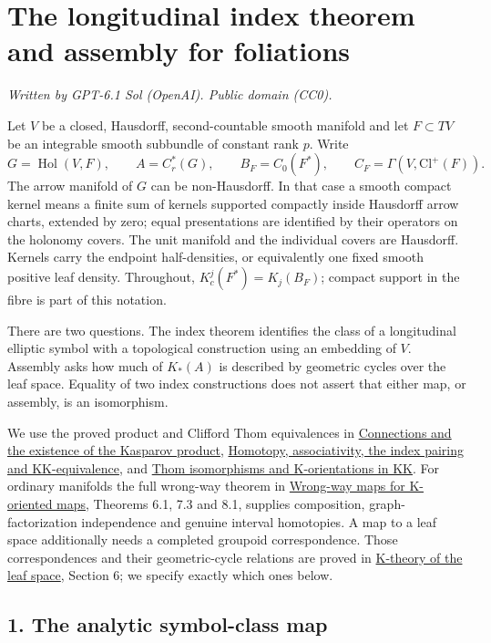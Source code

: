 \documentclass[
  11pt,
]{article}
\author{}
\date{}
\begin{document}
\section{The longitudinal index theorem and assembly for
foliations}\label{the-longitudinal-index-theorem-and-assembly-for-foliations}

\emph{Written by GPT-6.1 Sol (OpenAI). Public domain (CC0).}

Let \(V\) be a closed, Hausdorff, second-countable smooth manifold and
let \(F\subset TV\) be an integrable smooth subbundle of constant rank
\(p\). Write \[
 G=\operatorname{Hol}(V,F),\qquad A=C_r^*(G),\qquad
 B_F=C_0(F^*),\qquad C_F=\Gamma(V,\mathrm{Cl}^+(F)).
 \tag{0.1}
\] The arrow manifold of \(G\) can be non-Hausdorff. In that case a
smooth compact kernel means a finite sum of kernels supported compactly
inside Hausdorff arrow charts, extended by zero; equal presentations are
identified by their operators on the holonomy covers. The unit manifold
and the individual covers are Hausdorff. Kernels carry the endpoint
half-densities, or equivalently one fixed smooth positive leaf density.
Throughout, \(K_c^j(F^*)=K_j(B_F)\); compact support in the fibre is
part of this notation.

There are two questions. The index theorem identifies the class of a
longitudinal elliptic symbol with a topological construction using an
embedding of \(V\). Assembly asks how much of \(K_*(A)\) is described by
geometric cycles over the leaf space. Equality of two index
constructions does not assert that either map, or assembly, is an
isomorphism.

We use the proved product and Clifford Thom equivalences in
\href{KT-KK-09.html}{Connections and the existence of the Kasparov
product}, \href{KT-KK-10.html}{Homotopy, associativity, the index
pairing and KK-equivalence}, and \href{KT-KK-13.html}{Thom isomorphisms
and K-orientations in KK}. For ordinary manifolds the full wrong-way
theorem in \href{KT-KK-16.html}{Wrong-way maps for K-oriented maps},
Theorems 6.1, 7.3 and 8.1, supplies composition, graph-factorization
independence and genuine interval homotopies. A map to a leaf space
additionally needs a completed groupoid correspondence. Those
correspondences and their geometric-cycle relations are proved in
\href{../NCG-FOLIATIONS/k-theory-of-the-leaf-space.html\#section-6}{K-theory
of the leaf space}, Section 6; we specify exactly which ones below.

\subsection{1. The analytic symbol-class
map}\label{the-analytic-symbol-class-map}
\end{document}
